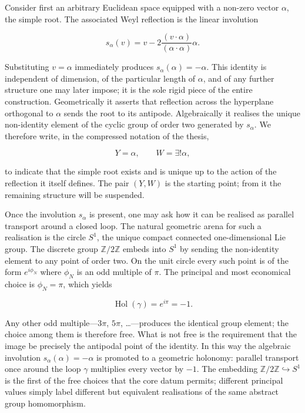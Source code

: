 Consider first an arbitrary Euclidean space equipped with a non-zero vector \(\alpha\), the simple root. The associated Weyl reflection is the linear involution

\[
s_\alpha(v)=v-2\frac{(v\cdot\alpha)}{(\alpha\cdot\alpha)}\alpha.
\]

Substituting \(v=\alpha\) immediately produces \(s_\alpha(\alpha)=-\alpha\). This identity is independent of dimension, of the particular length of \(\alpha\), and of any further structure one may later impose; it is the sole rigid piece of the entire construction. Geometrically it asserts that reflection across the hyperplane orthogonal to \(\alpha\) sends the root to its antipode. Algebraically it realises the unique non-identity element of the cyclic group of order two generated by \(s_\alpha\). We therefore write, in the compressed notation of the thesis,

\[
Y=\alpha,\qquad W=\exists!\alpha,
\]

to indicate that the simple root exists and is unique up to the action of the reflection it itself defines. The pair \((Y,W)\) is the starting point; from it the remaining structure will be suspended.

Once the involution \(s_\alpha\) is present, one may ask how it can be realised as parallel transport around a closed loop. The natural geometric arena for such a realisation is the circle \(S^1\), the unique compact connected one-dimensional Lie group. The discrete group \(\mathbb{Z}/2\mathbb{Z}\) embeds into \(S^1\) by sending the non-identity element to any point of order two. On the unit circle every such point is of the form \(e^{i\phi_N}\) where \(\phi_N\) is an odd multiple of \(\pi\). The principal and most economical choice is \(\phi_N=\pi\), which yields

\[
\operatorname{Hol}(\gamma)=e^{i\pi}=-1.
\]

Any other odd multiple—\(3\pi\), \(5\pi\), \ldots—produces the identical group element; the choice among them is therefore free. What is not free is the requirement that the image be precisely the antipodal point of the identity. In this way the algebraic involution \(s_\alpha(\alpha)=-\alpha\) is promoted to a geometric holonomy: parallel transport once around the loop \(\gamma\) multiplies every vector by \(-1\). The embedding \(\mathbb{Z}/2\mathbb{Z}\hookrightarrow S^1\) is the first of the free choices that the core datum permits; different principal values simply label different but equivalent realisations of the same abstract group homomorphism.

